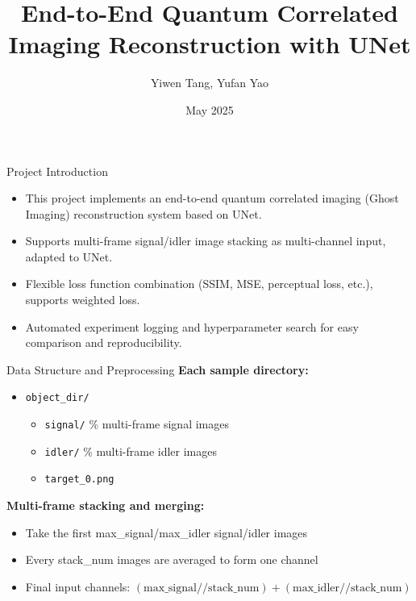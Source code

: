 \documentclass{beamer}
\title{End-to-End Quantum Correlated Imaging Reconstruction with UNet}
\author{Yiwen Tang, Yufan Yao}
\date{May 2025}
\begin{document}
\frame{\titlepage}

\begin{frame}{Project Introduction}
\begin{itemize}
    \item This project implements an end-to-end quantum correlated imaging (Ghost Imaging) reconstruction system based on UNet.
    \item Supports multi-frame signal/idler image stacking as multi-channel input, adapted to UNet.
    \item Flexible loss function combination (SSIM, MSE, perceptual loss, etc.), supports weighted loss.
    \item Automated experiment logging and hyperparameter search for easy comparison and reproducibility.
\end{itemize}
\end{frame}

\begin{frame}{Data Structure and Preprocessing}
\textbf{Each sample directory:}
\begin{itemize}
  \item \texttt{object\_dir/}
  \begin{itemize}
    \item \texttt{signal/} \hspace{1em} \% multi-frame signal images
    \item \texttt{idler/} \hspace{1em} \% multi-frame idler images
    \item \texttt{target_0.png}
  \end{itemize}
\end{itemize}
\vspace{0.5em}
\textbf{Multi-frame stacking and merging:}
\begin{itemize}
    \item Take the first max\_signal/max\_idler signal/idler images
    \item Every stack\_num images are averaged to form one channel
    \item Final input channels: $(\text{max\_signal}//\text{stack\_num}) + (\text{max\_idler}//\text{stack\_num})$
\end{itemize}
\end{frame}
\end{document}
